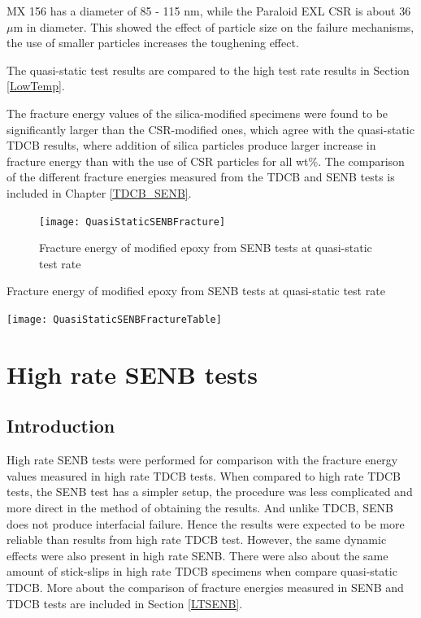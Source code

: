 \documentclass[numbers=noendperiod,chapterprefix=on]{icldt} %
\begin{document}
MX 156 has a diameter of 85 - 115 nm, while the Paraloid EXL %
CSR is about 36 $ \mu  $m in diameter. This showed the effect of particle size on the failure mechanisms, the use of smaller particles increases the toughening effect.

The quasi-static test results are compared to the high test rate results in Section \ref{LowTemp}. 

The fracture energy values of the silica-modified specimens were found to be significantly larger than the CSR-modified ones, which agree with the quasi-static TDCB results, where addition of silica particles produce larger increase in fracture energy than with the use of CSR particles for all wt\%. The comparison of the different fracture energies measured from the TDCB and SENB tests is included in Chapter \ref{TDCB_SENB}.
\begin{figure}[!hp]
\centering
\texttt{[image: QuasiStaticSENBFracture]}
\caption{Fracture energy of modified epoxy from SENB tests at quasi-static test rate} \label{QuasiStaticSENBFracture}\end{figure}
\FloatBarrier
\begin{table}[!htpb]
\centering
\caption{Fracture energy of modified epoxy from SENB tests at quasi-static test rate } \label{QuasiStaticSENBFractureTable}
\texttt{[image: QuasiStaticSENBFractureTable]}
\end{table}
\FloatBarrier

\section{High rate SENB tests} \label{HR_SENB}

\subsection{Introduction}
High rate SENB tests were performed for comparison with the fracture energy values measured in high rate TDCB tests. When compared to high rate TDCB tests, the SENB test has a simpler setup, the procedure was less complicated and more direct in the method of obtaining the results.
And unlike TDCB, SENB does not produce interfacial failure.
Hence the results were expected to be more reliable than results from high rate TDCB test.  However, the same dynamic effects were also present in high rate SENB. There were also about the same amount of stick-slips in high rate TDCB specimens when compare quasi-static TDCB. More about the comparison of fracture energies measured in SENB and TDCB tests are included in Section \ref{LTSENB}.
\end{document}

